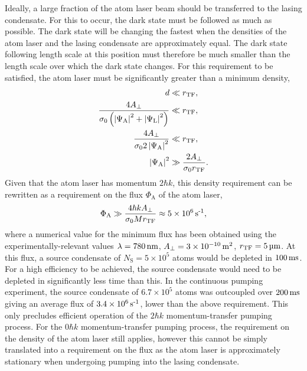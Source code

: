 Ideally, a large fraction of the atom laser beam should be transferred to the lasing condensate. For this to occur, the dark state must be followed as much as possible.  The dark state will be changing the fastest when the densities of the atom laser and the lasing condensate are approximately equal.  The dark state following length scale at this position must therefore be much smaller than the length scale over which the dark state changes.  For this requirement to be satisfied, the atom laser must be significantly greater than a minimum density,
\begin{align}
    d & \ll r_\text{TF}, \\
    \frac{4 A_\perp}{\sigma_0 \left(\left|\Psi_\text{A}\right|^2 + \left|\Psi_\text{L}\right|^2\right)} & \ll r_\text{TF}, \notag\\
    \frac{4 A_\perp}{\sigma_0 2 \left|\Psi_\text{A}\right|^2} &\ll r_\text{TF}, \notag\\
    \left|\Psi_\text{A}\right|^2 &\gg \frac{2 A_\perp}{\sigma_0 r_\text{TF}}.
\end{align}
Given that the atom laser has momentum $2 \hbar k$, this density requirement can be rewritten as a requirement on the flux $\Phi_\text{A}$ of the atom laser,
\begin{align}
    \Phi_\text{A} \gg \frac{4 \hbar k A_\perp}{\sigma_0 M r_\text{TF}} \approx 5\times\unit[10^6]{s\textsuperscript{-1}},
\end{align}
where a numerical value for the minimum flux has been obtained using the experimentally-relevant values $\lambda = \unit[780]{nm}$, $A_\perp = 3\times \unit[10^{-10}]{m\textsuperscript{2}}$, $r_\text{TF} = \unit[5]{\micro m}$.  At this flux, a source condensate of $N_\text{S} = 5 \times 10^5$ atoms would be depleted in $\unit[100]{ms}$.  For a high efficiency to be achieved, the source condensate would need to be depleted in significantly less time than this.  In the continuous pumping experiment, the source condensate of $6.7 \times 10^5$ atoms was outcoupled over $\unit[200]{ms}$ giving an average flux of $3.4\times\unit[10^6]{s\textsuperscript{-1}}$, lower than the above requirement.  This only precludes efficient operation of the $2\hbar k$ momentum-transfer pumping process.  For the $0 \hbar k$ momentum-transfer pumping process, the requirement on the density of the atom laser still applies, however this cannot be simply translated into a requirement on the flux as the atom laser is approximately stationary when undergoing pumping into the lasing condensate.

